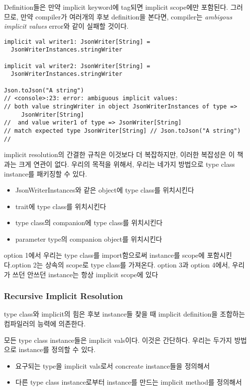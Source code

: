 \documentclass[a4paper]{article}
\begin{document}
Definition들은 만약 implicit keyword에 tag되면 implicit scope에만 포함된다. 그러므로, 만약 compiler가 여러개의 후보 definition을 본다면, compiler는 \emph{ambigous implicit values} error와 같이 실패할 것이다.

\begin{verbatim}
implicit val writer1: JsonWriter[String] =
  JsonWriterInstances.stringWriter

implicit val writer2: JsonWriter[String] =
  JsonWriterInstances.stringWriter

Json.toJson("A string")
// <console>:23: error: ambiguous implicit values:
// both value stringWriter in object JsonWriterInstances of type =>
     JsonWriter[String]
//  and value writer1 of type => JsonWriter[String]
// match expected type JsonWriter[String] // Json.toJson("A string")
//
\end{verbatim}

implicit resolution의 간결한 규칙은 이것보다 더 복잡하지만, 이러한 복잡성은 이 책과는 크게 연관이 없다. 우리의 목적을 위해서, 우리는 네가지 방법으로 type class instance를 패키징할 수 있다.

\begin{itemize}
\item JsonWriterInstances와 같은 object에 type class를 위치시킨다
\item trait에 type class를 위치시킨다
\item type class의 companion에 type class를 위치시킨다
\item parameter type의 companion object를 위치시킨다
\end{itemize}

option 1에서 우리는 type class를 import함으로써 instance를 scope에 포함시킨다.option 2는 상속의 scope로 type class를 가져온다. option 3과 option 4에서, 우리가 쓰던 안쓰던 instance는 항상 implicit scope에 있다 

\subsubsection{Recursive Implicit Resolution}
\label{sec:orgf3d2a64}

type class와 implicit의 힘은 후보 instance들 찾을 때 implicit definition을 조합하는 컴파일러의 능력에 의존한다.

모든 type class instance들은 implicit vals이다. 이것은 간단하다. 우리는 두가지 방법으로 instance를 정의할 수 있다.

\begin{itemize}
\item 요구되는 type을 implicit vals로서 concreate instance들을 정의해서
\item 다른 type class instance로부터 instance를 만드는 implicit method를 정의해서
\end{itemize}
\end{document}
